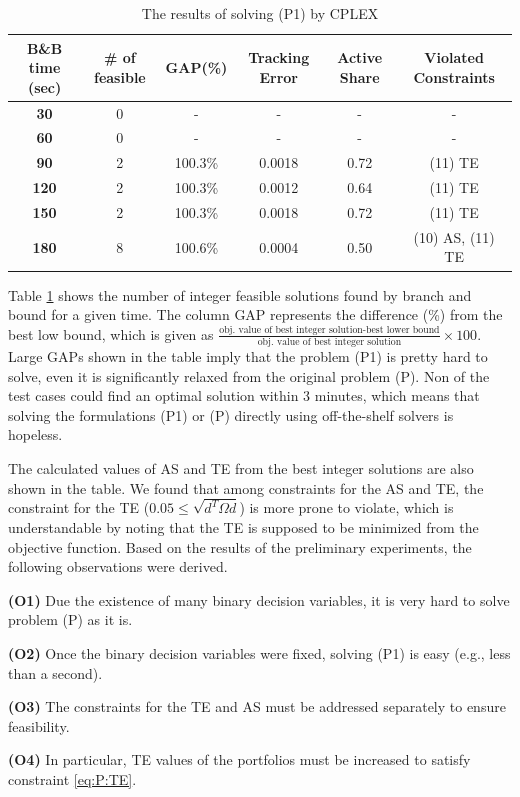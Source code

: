 \documentclass[11pt]{article}
\begin{document}
\begin{table}[]
	\centering
	\footnotesize 
	\caption{The results of solving (P1) by CPLEX}
	\label{tab:pre}
	\begin{tabular}{cccccc}
		\toprule
		\textbf{B\&B time (sec)} & \textbf{\# of feasible} & \textbf{GAP(\%)} & \textbf{Tracking Error} & \textbf{Active Share} & \textbf{Violated Constraints} \\
		\midrule
		\textbf{30} & 0 & - & - & - & -  \\
		\textbf{60} & 0 & - & - & - & -  \\
		\textbf{90} & 2 & 100.3\% & {\color[HTML]{CB0000} 0.0018} & 0.72 & (11) TE \\
		\textbf{120} & 2 & 100.3\% & {\color[HTML]{CB0000} 0.0012} & 0.64 & (11) TE \\
		\textbf{150} & 2 & 100.3\% & {\color[HTML]{CB0000} 0.0018} & 0.72 & (11) TE \\
		\textbf{180} & 8 & 100.6\% & {\color[HTML]{CB0000} 0.0004} & {\color[HTML]{CB0000} 0.50} & (10) AS, (11) TE  \\ 
		\bottomrule
	\end{tabular}
\end{table}

Table \ref{tab:pre} shows the number of integer feasible solutions found by branch and bound for a given time. The column GAP represents the difference (\%) from the best low bound, which is given as $\frac{\text{obj. value of best integer solution-best lower bound}}{\text{obj. value of best integer solution}} \times 100$. Large GAPs shown in the table imply that the problem (P1) is pretty hard to solve, even it is significantly relaxed from the original problem (P). Non of the test cases could find an optimal solution within 3 minutes, which means that solving the formulations (P1) or (P) directly using off-the-shelf solvers is hopeless. 

The calculated values of AS and TE from the best integer solutions are also shown in the table. We found that among constraints for the AS and TE, the constraint for the TE ($0.05 \le \sqrt{d^T \Omega d}$) is more prone to violate, which is understandable by noting that the TE is supposed to be minimized from the objective function. Based on the results of the preliminary experiments, the following observations were derived.
\begin{description}
\item \textbf{(O1)} Due the existence of many binary decision variables, it is very hard to solve problem (P) as it is.
\item \textbf{(O2)} Once the binary decision variables were fixed, solving (P1) is easy (e.g., less than a second).
\item \textbf{(O3)} The constraints for the TE and AS must be addressed separately to ensure feasibility.
\item \textbf{(O4)} In particular, TE values of the portfolios must be increased to satisfy constraint \eqref{eq:P:TE}.
\end{description}
\end{document}
